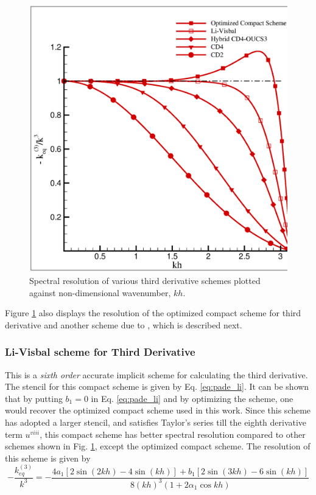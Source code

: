 \documentclass{svjour3}                    %
\begin{document}
\begin{figure}[h!]
\centerline{
\includegraphics[width=0.5\linewidth]{Fig_6}
}
\caption{Spectral resolution of various third derivative schemes plotted against non-dimensional wavenumber, $kh$.}
\label{fig:keq}
\end{figure}

Figure \ref{fig:keq} also displays the resolution of the optimized compact scheme for third derivative and another scheme due to \cite{Li2006}, which 
is described next.

\subsubsection{Li-Visbal scheme for Third Derivative}
This is a \emph{sixth order} accurate implicit scheme for calculating the third derivative. The stencil for this compact scheme is given by Eq. \eqref{eq:pade_li}. It can be shown that by putting $b_1=0$ in Eq. \eqref{eq:pade_li} and by optimizing the scheme, one would recover the optimized compact scheme used in this work. Since this scheme has adopted a larger stencil, and satisfies Taylor's series till the eighth derivative term $u^{viii}$, this compact scheme has better spectral resolution compared to other schemes shown in Fig. \ref{fig:keq}, except the optimized compact scheme. The resolution of this scheme is given by 
\begin{equation}
\label{eq:keq_li}
-\frac{k_{eq}^{(3)}}{k^{3}}=
      -\frac{4a_1\left[2\sin(2kh) - 4\sin (kh)\right] + b_1\left[2\sin(3kh)- 6\sin (kh) \right]}
           {8(kh)^3 (1+2\alpha_1\cos kh) }
\end{equation}

\end{document}
